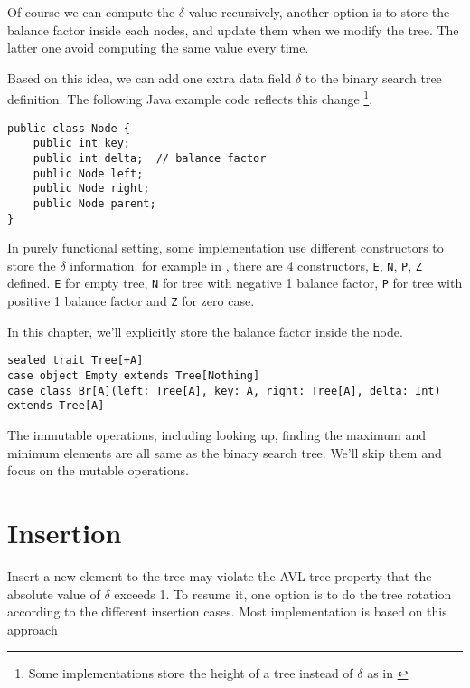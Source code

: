 \documentclass{article}
\begin{document}
Of course we can compute the $\delta$ value recursively, another option
is to store the balance factor inside each nodes, and update them
when we modify the tree. The latter one avoid computing the same value
every time.

Based on this idea, we can add one extra data field $\delta$ to the
binary search tree definition. The following Java example code reflects
this change \footnote{Some implementations store the height of a tree instead of $\delta$ as in \cite{py-avl}}.

\lstset{language=Java}
\begin{lstlisting}
public class Node {
    public int key;
    public int delta;  // balance factor
    public Node left;
    public Node right;
    public Node parent;
}
\end{lstlisting}

In purely functional setting, some implementation use different
constructors to store the $\delta$ information. for example in
\cite{hackage}, there are 4 constructors, \texttt{E}, \texttt{N}, \texttt{P}, \texttt{Z} defined.
\texttt{E} for empty tree, \texttt{N} for tree with negative 1 balance factor,
\texttt{P} for tree with positive 1 balance factor and \texttt{Z} for zero case.

In this chapter, we'll explicitly store the balance factor inside
the node.

\lstset{language=Scala}
\begin{lstlisting}
sealed trait Tree[+A]
case object Empty extends Tree[Nothing]
case class Br[A](left: Tree[A], key: A, right: Tree[A], delta: Int) extends Tree[A]
\end{lstlisting}

The immutable operations, including looking up, finding the maximum
and minimum elements are all same as the binary search tree. We'll
skip them and focus on the mutable operations.

\section{Insertion}

Insert a new element to the tree may violate the AVL tree property
that the absolute value of $\delta$ exceeds 1. To resume it, one option
is to do the tree rotation according to the different insertion cases.
Most implementation is based on this approach
\end{document}
